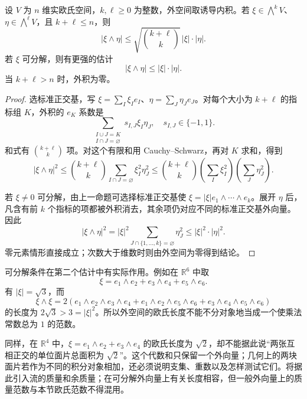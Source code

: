 \begin{proposition}\label{b1:prop:app-b-wedge-estimates}
设 \(V\) 为 \(n\) 维实欧氏空间，\(k,\ell\ge0\) 为整数，外空间取诱导内积。若 \(\xi\in\bigwedge^kV\)、\(\eta\in\bigwedge^\ell V\)，且 \(k+\ell\leq n\)，则
\[
 |\xi\wedge\eta|
 \leq\sqrt{\binom{k+\ell}{k}}\,
        |\xi|\cdot|\eta|.
\]
若 \(\xi\) 可分解，则有更强的估计
\[
 |\xi\wedge\eta|\leq|\xi|\cdot|\eta|.
\]
当 \(k+\ell>n\) 时，外积为零。
\end{proposition}
\begin{proof}
选标准正交基，写 \(\xi=\sum_I\xi_Ie_I\)、\(\eta=\sum_J\eta_Je_J\)。对每个大小为 \(k+\ell\) 的指标组 \(K\)，外积的 \(e_K\) 系数是
\[
 \sum_{\substack{I\cup J=K\\I\cap J=\varnothing}}
       s_{I,J}\xi_I\eta_J,\quad s_{I,J}\in\{-1,1\}.
\]
和式有 \(\binom{k+\ell}{k}\) 项。对这个有限和用 Cauchy--Schwarz，再对 \(K\) 求和，得到
\[
 |\xi\wedge\eta|^2
 \leq\binom{k+\ell}{k}
      \sum_{I\cap J=\varnothing}\xi_I^2\eta_J^2
 \leq\binom{k+\ell}{k}
      \left(\sum_I\xi_I^2\right)
      \left(\sum_J\eta_J^2\right).
\]

若 \(\xi\ne0\) 可分解，由上一命题可选择标准正交基使
\(\xi=|\xi|e_1\wedge\cdots\wedge e_k\)。展开 \(\eta\) 后，凡含有前 \(k\) 个指标的项都被外积消去，其余项仍对应不同的标准正交基外向量。因此
\[
 |\xi\wedge\eta|^2
   =|\xi|^2
      \sum_{J\cap\{1,\ldots,k\}=\varnothing}\eta_J^2
   \leq|\xi|^2\cdot|\eta|^2.
\]
零元素情形直接成立；次数大于维数时则由外空间为零得到结论。
\end{proof}

可分解条件在第二个估计中有实际作用。例如在 \(\mathbb R^6\) 中取
\[
 \xi=e_1\wedge e_2+e_3\wedge e_4+e_5\wedge e_6.
\]
有 \(|\xi|=\sqrt3\)，而
\[
 \xi\wedge\xi
  =2(e_1\wedge e_2\wedge e_3\wedge e_4
     +e_1\wedge e_2\wedge e_5\wedge e_6
     +e_3\wedge e_4\wedge e_5\wedge e_6)
\]
的长度为 \(2\sqrt3>3=|\xi|^2\)。所以外空间的欧氏长度不能不分对象地当成一个使乘法常数总为 \(1\) 的范数。

\ProseParagraphBreak

同样，在 \(\mathbb R^4\) 中，\(\xi=e_1\wedge e_2+e_3\wedge e_4\) 的欧氏长度为 \(\sqrt2\)，却不能据此说“两张互相正交的单位面片总面积为 \(\sqrt2\)”。这个代数和只保留一个外向量；几何上的两块面片若作为不同的积分对象相加，还必须说明支集、重数以及怎样测试它们。将据此引入流的质量和余质量；在可分解外向量上有关长度相容，但一般外向量上的质量范数与本节欧氏范数不得混用。

